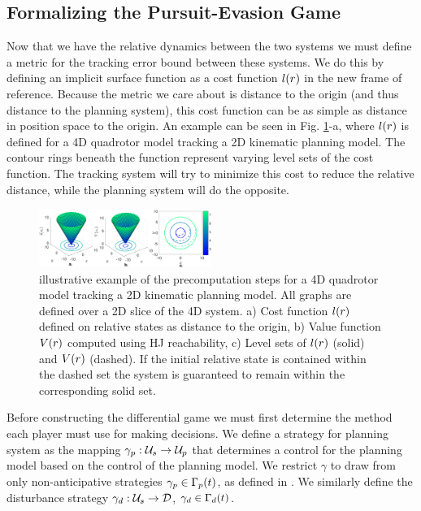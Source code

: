 \subsection{Formalizing the Pursuit-Evasion Game}
Now that we have the relative dynamics between the two systems we must define a metric for the tracking error bound between these systems. We do this by defining an implicit surface function as a cost function $l(r)$ in the new frame of reference. Because the metric we care about is distance to the origin (and thus distance to the planning system), this cost function can be as simple as distance in position space to the origin. An example can be seen in Fig. \ref{fig:quad4D_example}-a, where $l(r)$ is defined for a 4D quadrotor model tracking a 2D kinematic planning model. The contour rings beneath the function represent varying level sets of the cost function. The tracking system will try to minimize this cost to reduce the relative distance, while the planning system will do the opposite.
\begin{figure}
	\centering
	\includegraphics[width=0.5\textwidth]{fig/quad4D_example}
	\caption{illustrative example of the precomputation steps for a 4D quadrotor model tracking a 2D kinematic planning model. All graphs are defined over a 2D slice of the 4D system. a) Cost function $l(r)$ defined on relative states as distance to the origin, b) Value function $V(r)$ computed using HJ reachability, c) Level sets of $l(r)$ (solid) and $V(r)$ (dashed). If the initial relative state is contained within the dashed set the system is guaranteed to remain within the corresponding solid set.}
	\label{fig:quad4D_example}
	\vspace{-.2in}
\end{figure} 

Before constructing the differential game we must first determine the method each player must use for making decisions. We define a strategy for planning system as the mapping $\gamma_{p} : \mathcal{U}_s \rightarrow \mathcal{U}_p$ that determines a control for the planning model based on the control of the planning model. We restrict $\gamma$ to draw from only non-anticipative strategies $\gamma_{p} \in \Gamma_p(t)$, as defined in \cite{Mitchell05}. We similarly define the disturbance strategy $\gamma_{d}: \mathcal{U}_s \rightarrow \mathcal{D}$, $\gamma_{d} \in \Gamma_d(t)$.

